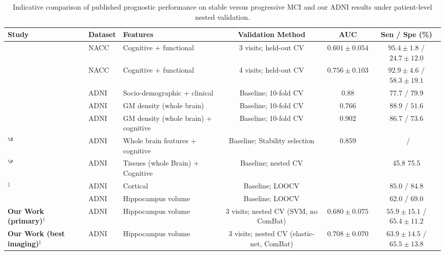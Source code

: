 \documentclass[review]{elsarticle}
\begin{document}
	\begin{table}
		\centering
		\footnotesize
		\setlength{\tabcolsep}{4pt}
		\renewcommand{\arraystretch}{1.15}
		\caption{Indicative comparison of published prognostic performance on stable versus progressive MCI and our ADNI results under patient-level nested validation.}
		\label{tab:literature_comparison}
		\begin{tabular}{@{}lllccc@{}}
			\toprule
			\textbf{Study} & \textbf{Dataset} & \textbf{Features} &
			\textbf{Validation Method} & \textbf{AUC} & \textbf{Sen / Spe (\%)} \\
			\midrule
			\citet{bucholc-2023} & NACC &
			Cognitive + functional &
			3 visits; held-out CV &
			$0.601 \pm 0.054$ & $95.4 \pm 1.8$ / $24.7 \pm 12.0$ \\
			\citet{bucholc-2023} & NACC &
			Cognitive + functional &
			4 visits; held-out CV &
			$0.756 \pm 0.103$ & $92.9 \pm 4.6$ / $58.3 \pm 19.1$ \\
			\citet{grassi-2019} & ADNI &
			Socio-demographic + clinical &
			Baseline; 10-fold CV &
			$0.88$ & $77.7$ / $79.9$ \\
			\citet{moradi-2015} & ADNI &
			GM density (whole brain) &
			Baseline; 10-fold CV &
			$0.766$ & $88.9$ / $51.6$ \\
			\citet{moradi-2015} & ADNI &
			GM density (whole brain) + cognitive &
			Baseline; 10-fold CV &
			$0.902$ & $86.7$ / $73.6$ \\
			\citet{ye-2012}$^{\S}$ & ADNI &
			Whole brain features + cognitive &
			Baseline; Stability selection &
			$0.859$ & \textemdash\ / \textemdash \\
			\citet{casanova-2013}$^{\P}$ & ADNI &
			Tissues (whole Brain) + Cognitive &
			Baseline; nested CV &
			\textemdash & 45.8 \/ 75.5 \\
			\citet{guo-2017a}$^{\|}$ & ADNI &
			Cortical  &
			Baseline; LOOCV &
			\textemdash & $85.0$ / $84.8$ \\
			\citet{cuingnet-2011} & ADNI &
			Hippocampus volume &
			Baseline; LOOCV &
			\textemdash & $62.0$ / $69.0$ \\
			\midrule
			\textbf{Our Work (primary)}$^{\dagger}$ & ADNI &
			Hippocampus volume &
			3 visits; nested CV (SVM, no ComBat) &
			$\mathbf{0.680 \pm 0.075}$ & $\mathbf{55.9 \pm 15.1}$ / $\mathbf{65.4 \pm 11.2}$ \\
			\textbf{Our Work (best imaging)}$^{\ddagger}$ & ADNI &
			Hippocampus volume &
			3 visits; nested CV (elastic-net, ComBat) &
			$\mathbf{0.708 \pm 0.070}$ & $\mathbf{63.9 \pm 14.5}$ / $\mathbf{65.5 \pm 13.8}$ \\

\end{tabular}
\end{table}
\end{document}
